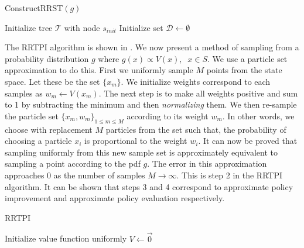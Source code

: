\documentclass[wcp]{jmlr}
\begin{document}
\begin{algorithm2e}
\caption{ConstructRRST$(g)$}
\label{alg:rrst}
\dontprintsemicolon
Initialize tree $\mathcal{T}$ with node $s_{init}$\;
Initialize set $\mathcal{D} \leftarrow \emptyset$\;
\end{algorithm2e}
 The RRTPI algorithm is shown in  . We now present a method of sampling from a probability distribution $g$ where  $g(x) \propto V(x),\;\;x\in S$. We use a particle set approximation to do this. First we uniformly sample $M$ points from the state space. Let these be the set $\{x_m\}$. We initialize weights correspond to each samples as $w_m \leftarrow V(x_m) $. The next step is to make all weights positive and sum to 1 by subtracting the minimum and then \textit{normalizing} them. We then re-sample the particle set $\{x_m,w_m\}_{1\leq m \leq M}$ according to its weight $w_m$. In other words, we choose with replacement $M$ particles from the set such that, the probability of choosing a particle $x_i$ is proportional to the weight $w_i$. It can now be proved that sampling uniformly from this new sample set is approximately equivalent to sampling a point according to the pdf $g$. The error in this approximation approaches 0 as the number of samples $M \rightarrow \infty$. This is step 2 in the RRTPI algorithm. It can be shown that steps 3 and 4 correspond to approximate policy improvement and approximate policy evaluation respectively.

\begin{algorithm2e}
\caption{RRTPI}
\label{alg:rrtpi}
\dontprintsemicolon
\nl Initialize value function uniformly $V\leftarrow \vec{0}$\;
\end{algorithm2e}
\end{document}

